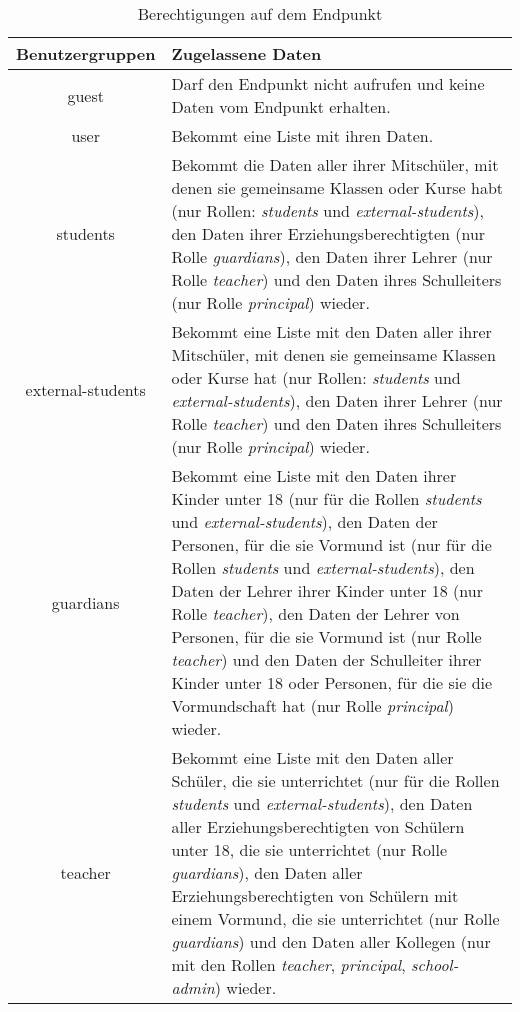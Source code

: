 \begin{longtable}{|c|p{}|}
\caption{Berechtigungen auf dem Endpunkt}
\endfoot
\caption{Berechtigungen auf dem Endpunkt}
\label{tab:end:rest:api:school:users:read:right} 
\endlastfoot
\hline
\textbf{Benutzergruppen} & \textbf{Zugelassene Daten} \\ \hline
\endhead
guest & Darf den Endpunkt nicht aufrufen und keine Daten vom Endpunkt erhalten. \\ \hline
user & Bekommt eine Liste mit ihren Daten. \\ \hline 
students & Bekommt die Daten aller ihrer Mitschüler, mit denen sie gemeinsame Klassen oder Kurse habt (nur Rollen: \textit{students} und \textit{external-students}),
           den Daten ihrer Erziehungsberechtigten (nur Rolle \textit{guardians}), 
					 den Daten ihrer Lehrer (nur Rolle \textit{teacher}) und 
					 den Daten ihres Schulleiters (nur Rolle \textit{principal}) wieder.\\ \hline
external-students &  Bekommt eine Liste mit den Daten aller ihrer Mitschüler, mit denen sie gemeinsame Klassen oder Kurse hat (nur Rollen: \textit{students} und \textit{external-students}),
           den Daten ihrer Lehrer (nur Rolle \textit{teacher}) und 
					 den Daten ihres Schulleiters (nur Rolle \textit{principal}) wieder.\\ \hline
guardians & Bekommt eine Liste mit den Daten ihrer Kinder unter 18 (nur für die Rollen \textit{students} und \textit{external-students}), 
					den Daten der Personen, für die sie Vormund ist (nur für die Rollen \textit{students} und \textit{external-students}), 
					den Daten der Lehrer ihrer Kinder unter 18 (nur Rolle \textit{teacher}),
					den Daten der Lehrer von Personen, für die sie Vormund ist (nur Rolle \textit{teacher})	und
					den Daten der Schulleiter ihrer Kinder unter 18 oder Personen, für die sie die Vormundschaft hat (nur Rolle \textit{principal})
					wieder.\\ \hline
teacher & Bekommt eine Liste mit den Daten aller Schüler, die sie unterrichtet (nur für die Rollen \textit{students} und \textit{external-students}),
					den Daten aller Erziehungsberechtigten von Schülern unter 18, die sie unterrichtet (nur Rolle \textit{guardians}),
					den Daten aller Erziehungsberechtigten von Schülern mit einem Vormund, die sie unterrichtet (nur Rolle \textit{guardians}) und
					den Daten aller Kollegen (nur mit den Rollen \textit{teacher}, \textit{principal}, \textit{school-admin}) 
					wieder.\\ \hline

\end{longtable}
